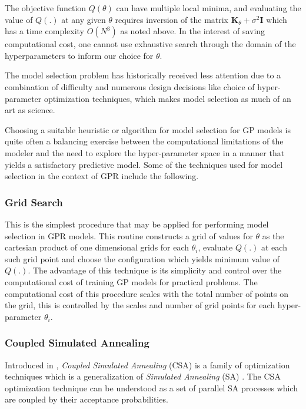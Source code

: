 \documentclass{article}
\begin{document}
The objective function $Q(\theta)$ can have multiple local minima, and
evaluating the value of $Q(.)$ at any given $\theta$ requires
inversion of the matrix $\mathbf{K}_\theta + \sigma^{2} \mathbf{I}$
which has a time complexity $O(N^3)$ as noted above. In the interest
of saving computational cost, one cannot use exhaustive search through
the domain of the hyperparameters to inform our choice for $\theta$.

The model selection problem has historically received less attention
due to a combination of difficulty and numerous design decisions like
choice of hyper-parameter optimization techniques, which makes model
selection as much of an art as science. 

Choosing a suitable heuristic or algorithm for model selection for GP
models is quite often a balancing exercise between the computational
limitations of the modeler and the need to explore the hyper-parameter
space in a manner that yields a satisfactory predictive model. Some of
the techniques used for model selection in the context of GPR include
the following.


\subsubsection*{Grid Search}

This is the simplest procedure that may be applied for performing
model selection in GPR models. This routine constructs a grid of
values for $\theta$ as the cartesian product of one dimensional grids
for each $\theta_i$, evaluate $Q(.)$ at each such grid point and
choose the configuration which yields minimum value of $Q(.)$. The
advantage of this technique is its simplicity and control over the
computational cost of training GP models for practical problems. The
computational cost of this procedure scales with the total number of
points on the grid, this is controlled by the scales and number of
grid points for each hyper-parameter $\theta_i$.

\subsubsection*{Coupled Simulated Annealing}

Introduced in \citet{Xavier-De-Souza2010}, \emph{Coupled Simulated
  Annealing} (CSA) is a family of optimization techniques which is a
generalization of \emph{Simulated Annealing} (SA)
\citep{Kirkpatrick671}. The CSA optimization technique can be
understood as a set of parallel SA processes which are coupled by
their acceptance probabilities.
\end{document}
